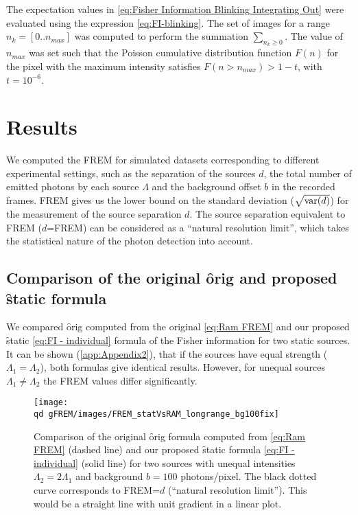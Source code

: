 The expectation values in \autoref{eq:Fisher Information Blinking Integrating Out} were evaluated using the expression \autoref{eq:FI-blinking}. The set of images for a range $n_k=[0..n_{max}]$ was computed to perform the summation $\sum_{n_k\geq0}$. The value of $n_{max}$ was set such that the Poisson cumulative distribution function $F(n)$ for the pixel with the maximum intensity satisfies $F(n>n_{max})>1-t$, with $t=10^{-6}$.
\afterpage{\clearpage}


\section{Results\label{sec:FREM results}}

We computed the FREM for simulated datasets corresponding to different experimental settings, such as the separation of the sources $d$, the total number of emitted photons by each source $\Lambda$ and the background offset $b$ in the recorded frames. FREM gives us the lower bound on the standard deviation ($\sqrt{\mathrm{var}(d)}$) for the measurement of the source separation $d$. The source separation equivalent to FREM ($d$=FREM) can be considered as a ``natural resolution limit'', which takes the statistical nature of the photon detection into account.

\subsection{Comparison of the original \f{orig} and proposed \f{static} formula\label{sec:comparison orig and new FREM}}

We compared \f{orig} computed from the original \autoref{eq:Ram FREM} and our proposed \f{static} \autoref{eq:FI - individual} formula of the Fisher information for two static sources. It can be shown (\autoref{app:Appendix2}), that if the sources have equal strength ($\Lambda_1=\Lambda_2$), both formulas give identical results. However, for unequal sources $\Lambda_1\neq\Lambda_2$ the FREM values differ significantly. 
%
\begin{figure}[!hbt]
	\centering
	\newcommand{\wf}{.49\textwidth}
	\texttt{[image: \\qd gFREM/images/FREM\_statVsRAM\_longrange\_bg100fix]}
	\caption{Comparison of the original \f{orig} formula computed from \autoref{eq:Ram FREM} (dashed line) and our proposed \f{static} formula \autoref{eq:FI - individual} (solid line) for two sources with unequal intensities $\Lambda_2=2\Lambda_1$ and background $b=100$ photons/pixel. The black dotted curve corresponds to FREM=$d$ (``natural resolution limit''). This would be a straight line with unit gradient in a linear plot.} 
	\label{fig:Comparison FREM Ram and fix}
\end{figure}

